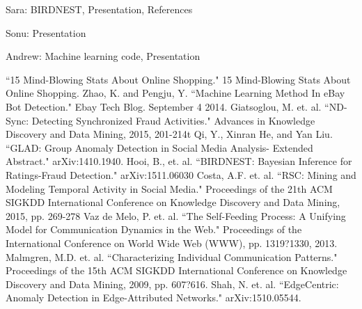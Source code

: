 \documentclass{article} %
\begin{document}
Sara: BIRDNEST, Presentation, References

Sonu: Presentation

Andrew: Machine learning code, Presentation

\begin{thebibliography}{123}

 ``15 Mind-Blowing Stats About Online Shopping." 15 Mind-Blowing Stats About Online Shopping.
 Zhao, K. and Pengju, Y. ``Machine Learning Method In eBay Bot Detection." Ebay Tech Blog. September 4 2014.
 Giatsoglou, M. et. al. ``ND-Sync: Detecting Synchronized Fraud Activities." Advances in Knowledge Discovery and Data Mining, 2015, 201-214t
 Qi, Y., Xinran He, and Yan Liu. ``GLAD: Group Anomaly Detection in Social Media Analysis- Extended Abstract." arXiv:1410.1940.
 Hooi, B., et. al. ``BIRDNEST: Bayesian Inference for Ratings-Fraud Detection." arXiv:1511.06030
 Costa, A.F. et. al. ``RSC: Mining and Modeling Temporal Activity in Social Media." Proceedings of the 21th ACM SIGKDD International Conference on Knowledge Discovery and Data Mining, 2015, pp. 269-278
 Vaz de Melo, P. et. al. ``The Self-Feeding Process: A Unifying Model for Communication Dynamics in the Web." Proceedings of the International Conference on World Wide Web (WWW), pp. 1319?1330, 2013.
 Malmgren, M.D. et. al. ``Characterizing Individual Communication Patterns." Proceedings of the 15th ACM SIGKDD International Conference on Knowledge Discovery and Data Mining, 2009, pp. 607?616.
 Shah, N. et. al. ``EdgeCentric: Anomaly Detection in Edge-Attributed Networks." arXiv:1510.05544.

\end{thebibliography}
\end{document}
